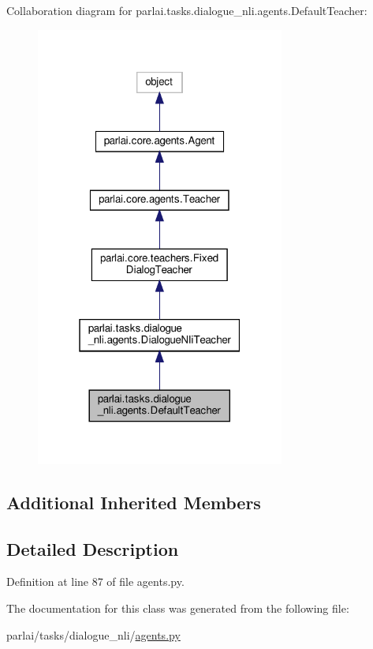 Collaboration diagram for parlai.\+tasks.\+dialogue\+\_\+nli.\+agents.\+Default\+Teacher\+:
\nopagebreak
\begin{figure}[H]
\begin{center}
\leavevmode
\includegraphics[width=232pt]{dc/d2d/classparlai_1_1tasks_1_1dialogue__nli_1_1agents_1_1DefaultTeacher__coll__graph}
\end{center}
\end{figure}
\subsection*{Additional Inherited Members}


\subsection{Detailed Description}


Definition at line 87 of file agents.\+py.



The documentation for this class was generated from the following file\+:\begin{DoxyCompactItemize}
\item 
parlai/tasks/dialogue\+\_\+nli/\hyperlink{parlai_2tasks_2dialogue__nli_2agents_8py}{agents.\+py}\end{DoxyCompactItemize}
